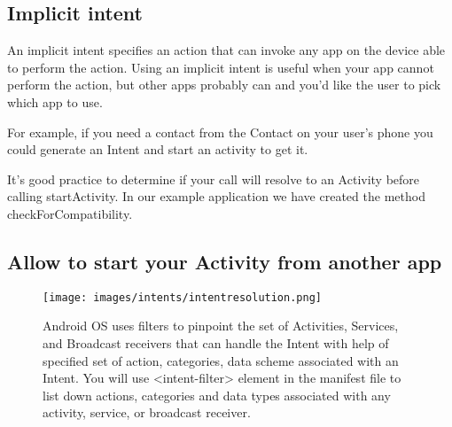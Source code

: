 

\subsection{Implicit intent}
An implicit intent specifies an action that can invoke any app on the device able to perform the action.
Using an implicit intent is useful when your app cannot perform the action, but other apps probably can and you'd like the user to pick which app to use.

For example, if you need a contact from the Contact on your user's phone you could generate an Intent and start an activity to get it. 




\begin{framed}
It's good practice to determine if your call will resolve to an Activity before calling startActivity. In our example application we have created the method checkForCompatibility.
\end{framed}



\subsection{Allow to start your Activity from another app}

\begin{figure}
	\texttt{[image: images/intents/intentresolution.png]}
	\caption{Android OS uses filters to pinpoint the set of Activities, Services, and Broadcast receivers that can handle the Intent with help of specified set of action, categories, data scheme associated with an Intent.
		You will use <intent-filter> element in the manifest file to list down actions, categories and data types associated with any activity, service, or broadcast receiver.}
	\label{fig:intentresolution}
\end{figure}

